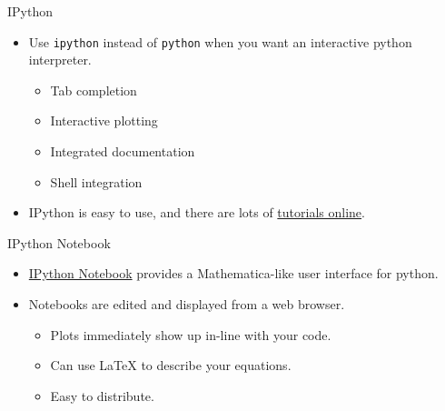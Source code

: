 \begin{frame}{IPython}

 \begin{itemize}

  \item Use \texttt{ipython} instead of \texttt{python} when you want an 
   interactive python interpreter.

  \begin{itemize}
   \item Tab completion
   \item Interactive plotting
   \item Integrated documentation
   \item Shell integration
  \end{itemize}

  \item IPython is easy to use, and there are lots of 
   \href{http://ipython.org/ipython-doc/2/interactive/tutorial.html}{tutorials 
   online}.

 \end{itemize}

\end{frame}

\begin{frame}{IPython Notebook}

 \begin{itemize}

  \item 
   \href{http://ipython.org/ipython-doc/stable/notebook/index.html}{IPython 
   Notebook} provides a Mathematica-like user interface for python.

  \item Notebooks are edited and displayed from a web browser.

  \begin{itemize}
   \item Plots immediately show up in-line with your code.
   \item Can use LaTeX to describe your equations.
   \item Easy to distribute.
  \end{itemize}

 \end{itemize}

\end{frame}
